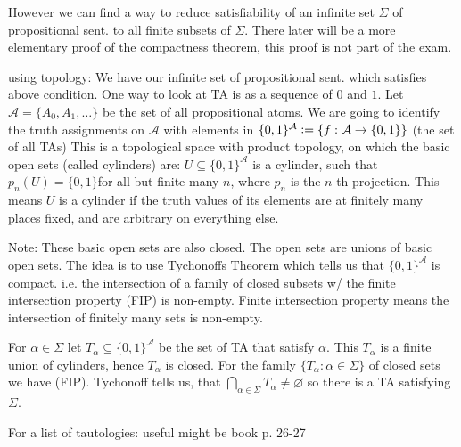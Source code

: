 However we can find a way to reduce satisfiability of an infinite set $\Sigma$ of propositional sent. to all finite subsets of $\Sigma$.
There later will be a more elementary proof of the compactness theorem, this proof is not part of the exam.
{
    using topology: We have our infinite set of propositional sent. which satisfies above condition. One way to look at TA is as a sequence of $0$ and $1$.
    Let $\mathcal{A} = \{A_0, A_1,\dots\}$ be the set of all propositional atoms. We are going to identify the truth assignments on $\mathcal{A}$
    with elements in $\{0,1\}^\mathcal{A}\vcentcolon= \{f: \mathcal{A}\to \{0,1\}\}$ (the set of all TAs)
    This is a topological space with product topology, on which 
    the basic open sets (called cylinders) are:
    $ U\subseteq \{0,1\}^\mathcal{A}$ is a cylinder, such that $p_n(U) = \{0,1\}$for all but finite many $n$, where $p_n$ is the $n$-th projection.
    This means $U$ is a cylinder if the truth values of its elements are at finitely many places fixed, and are arbitrary on everything else.
    
    Note: These basic open sets are also closed.
    The open sets are unions of basic open sets.
    The idea is to use Tychonoffs Theorem which tells us that $\{0,1\}^\mathcal{A}$ is compact. i.e.
    the intersection of a family of closed subsets w/ the finite intersection property (FIP) is non-empty.
    Finite intersection property means the intersection of finitely many sets is non-empty.

    For $\alpha \in \Sigma$ let $T_\alpha \subseteq \{0,1\}^\mathcal{A}$ be the set of TA that satisfy $\alpha$.
    This $T_\alpha$ is a finite union of cylinders, hence $T_\alpha$ is closed.
    For the family $\{T_\alpha: \alpha\in\Sigma\}$ of closed sets we have (FIP). Tychonoff tells us, 
    that $\bigcap_{\alpha\in\Sigma}{T_\alpha}\neq \varnothing$ so there is a TA satisfying $\Sigma$.}
    
    For a list of tautologies: useful might be book p. 26-27

